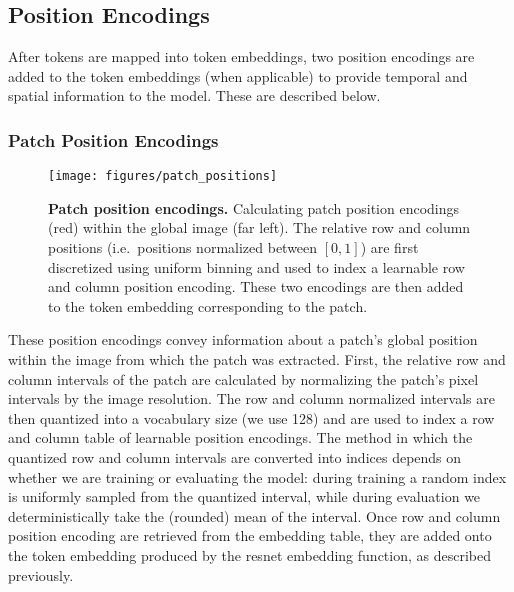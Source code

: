 \documentclass[10pt]{article} \usepackage[accepted]{tmlr}
\begin{document}
\vskip 0.4cm
\subsection{Position Encodings}
\vskip 0.2cm
\label{sec:position_encodings}

After tokens are mapped into token embeddings, two position encodings are added to the token embeddings (when applicable) to provide temporal and spatial information to the model. These are described below.
\subsubsection*{Patch Position Encodings}
\begin{figure}[t]
    \centering
    \texttt{[image: figures/patch\_positions]}
    \caption{
    {\bf Patch position encodings.}
    Calculating patch position encodings  (red) within the global image (far left). The relative row and column positions (i.e.\ positions normalized between $[0,1]$) are first discretized using uniform binning and used to index a learnable row and column position encoding. These two encodings are then added to the token embedding corresponding to the patch.
    \small}
    \label{fig:pos_encs}
\end{figure}


These position encodings convey information about a patch's global position within the image from which the patch was extracted. First, the relative row and column intervals of the patch are calculated by normalizing the patch's pixel intervals by the image resolution. The row and column normalized intervals are then quantized into a vocabulary size (we use 128) and are used to index a row and column table of learnable position encodings. The method in which the quantized row and column intervals are converted into indices depends on whether we are training or evaluating the model: during training a random index is uniformly sampled from the quantized interval, while during evaluation we deterministically take the (rounded) mean of the interval. Once row and column position encoding are retrieved from the embedding table, they are added onto the token embedding produced by the resnet embedding function, as described previously.
\end{document}
